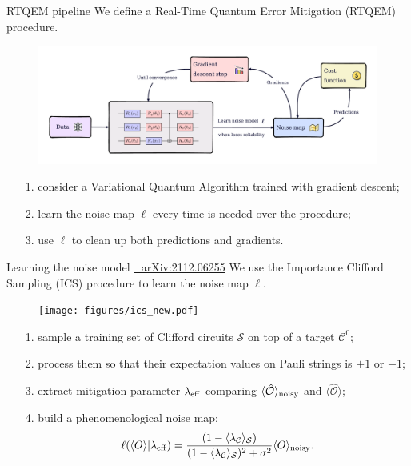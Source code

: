\documentclass[8pt, xcolor={svgnames}, hyperref={linkcolor=black}]{beamer}
\begin{document}
\begin{frame}{RTQEM pipeline}
We define a Real-Time Quantum Error Mitigation (RTQEM) procedure.
\pause
\begin{figure}
    \includegraphics[width=1\textwidth]{figures/rtqem.pdf}
\end{figure}
\pause
\begin{itemize}[noitemsep]
\item[1.] consider a Variational Quantum Algorithm trained with gradient descent;
\pause
\item[2.] learn the noise map $\ell$ every time is needed over the procedure;
\pause
\item[3.] use $\ell$ to clean up both predictions and gradients.
\end{itemize}
\end{frame}

\begin{frame}{Learning the noise model \hfill \href{https://arxiv.org/abs/2112.06255}{\faBook\,\, arXiv:2112.06255}}
We use the Importance Clifford Sampling (ICS) procedure to learn the noise map $\ell$.
\pause
\begin{figure}
    \texttt{[image: figures/ics\_new.pdf]}
\end{figure}
\pause
\begin{itemize}[noitemsep]
\item[1.] sample a training set of Clifford circuits $\mathcal{S}$ on top of a target $\mathcal{C}^0$;
\pause
\item[2.] process them so that their expectation values on Pauli strings is  $+1$ or $-1$;
\pause
\item[3.] extract mitigation parameter $\lambda_{\rm eff}$ comparing $\langle \hat{\mathcal{O}}\rangle_{\rm noisy}$ and $\langle \hat{\mathcal{O}}\rangle$;
\pause
\item[4.] build a phenomenological noise map:
$$ \ell(\langle O \rangle | \lambda_{\rm eff}) = \frac{(1 - \langle \lambda_{\mathcal{C}}
\rangle_{\mathcal{S}})}{(1 - \langle \lambda_{\mathcal{C}}\rangle_{\mathcal{S}})^2 
+ \sigma^2} \langle O \rangle_{\rm noisy}.$$
\end{itemize}
\end{frame}
\end{document}
